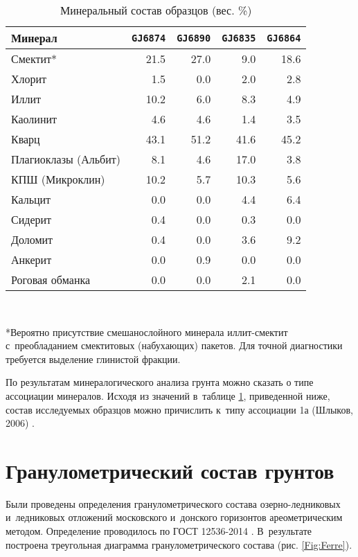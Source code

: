 \begin{table}[]
    \centering
    \small
    \caption{Минеральный состав образцов (вес. \%)} \label{tab:mineral}
    \begin{tabular}{@{}lrrrr@{}}
    \toprule
    Минерал & \texttt{GJ6874} &	\texttt{GJ6890} & \texttt{GJ6835} & \texttt{GJ6864}  \\ \midrule
    Смектит*	& 21.5	& 27.0	& 9.0	& 18.6 \\
    Хлорит	& 1.5	& 0.0	& 2.0	& 2.8 \\
    Иллит	& 10.2	& 6.0	& 8.3	& 4.9 \\
    Каолинит	& 4.6	& 4.6	& 1.4	& 3.5 \\
    Кварц	& 43.1	& 51.2	& 41.6	& 45.2 \\
    Плагиоклазы (Альбит)	& 8.1	& 4.6	& 17.0	& 3.8 \\
    КПШ (Микроклин)	& 10.2	& 5.7	& 10.3	& 5.6 \\
    Кальцит	& 0.0	& 0.0	& 4.4	& 6.4 \\
    Сидерит	& 0.4	& 0.0	& 0.3	& 0.0 \\
    Доломит	& 0.4	& 0.0	& 3.6	& 9.2 \\
    Анкерит	& 0.0	& 0.9	& 0.0	& 0.0 \\
    Роговая обманка	& 0.0	& 0.0	& 2.1	& 0.0 \\ \bottomrule
    \end{tabular}
    \\ 
    \raggedright 
    *Вероятно присутствие смешанослойного минерала иллит-смектит с~преобладанием смектитовых (набухающих) пакетов. Для точной диагностики требуется выделение глинистой фракции.
\end{table}
	
По результатам минералогического анализа грунта можно сказать о типе ассоциации минералов. 
Исходя из значений в~таблице \ref{tab:mineral}, приведенной ниже, состав исследуемых образцов можно причислить к~типу ассоциации 1а (Шлыков, 2006) \cite{Sh_2006}.


\section{Гранулометрический состав грунтов}

Были проведены определения гранулометрического состава озерно-ледниковых и~ледниковых отложений московского и~донского горизонтов ареометрическим методом. Определение проводилось по ГОСТ 12536-2014 \cite{gost12536}. В~результате построена треугольная диаграмма гранулометрического состава (рис. \ref{Fig:Ferre}).

